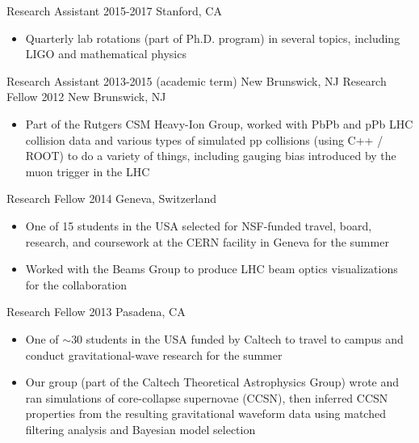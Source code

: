 \documentclass[8pt,a4paper]{altacv}
\begin{document}
                {Research Assistant}
                {2015-2017}
                {Stanford, CA}
                {\begin{itemize}[leftmargin=0pt]
                \renewcommand\labelitemi{}
                    \item Quarterly lab rotations (part of Ph.D. program) in several topics, including LIGO and mathematical physics
                \end{itemize}}

            {Research Assistant}
            {2013-2015 (academic term)}
            {New Brunswick, NJ}
            {}
    \vspace{-8pt}
    \cvevent{}
            {Research Fellow}
            {2012}
            {New Brunswick, NJ}
            {\begin{itemize}[leftmargin=0pt]
            \renewcommand\labelitemi{}
                \item Part of the Rutgers CSM Heavy-Ion Group, worked with PbPb and pPb LHC collision data and various types of simulated pp collisions (using C++ / ROOT) to do a variety of things, including gauging bias introduced by the muon trigger in the LHC
            \end{itemize}}
    
            {Research Fellow}
            {2014}
            {Geneva, Switzerland}
            {\begin{itemize}[leftmargin=0pt]
            \renewcommand\labelitemi{}
                \item {\color{emphasis}One of 15 students in the USA selected for NSF-funded travel, board, research, and coursework at the CERN facility in Geneva for the summer}
                \item Worked with the Beams Group to produce LHC beam optics visualizations for the collaboration
            \end{itemize}}
    
            {Research Fellow}
            {2013}
            {Pasadena, CA}
            {\begin{itemize}[leftmargin=0pt]
            \renewcommand\labelitemi{}
                \item {\color{emphasis}One of $\sim$30 students in the USA funded by Caltech to travel to campus and conduct gravitational-wave research for the summer}
                \item Our group (part of the Caltech Theoretical Astrophysics Group) wrote and ran simulations of core-collapse supernovae (CCSN), then inferred CCSN properties from the resulting gravitational waveform data using matched filtering analysis and Bayesian model selection
                \end{itemize}}
\end{document}

